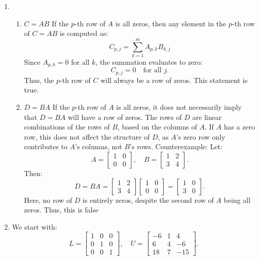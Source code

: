 \documentclass[12pt]{article}
\begin{document}
\begin{enumerate}
\item 
\begin{enumerate}
    \item \( C = AB \)
If the \( p \)-th row of \( A \) is all zeros, then any element in the \( p \)-th row of \( C = AB \) is computed as:
\[
C_{p,j} = \sum_{k=1}^m A_{p,k} B_{k,j}
\]
Since \( A_{p,k} = 0 \) for all \( k \), the summation evaluates to zero:
\[
C_{p,j} = 0 \quad \text{for all } j.
\]
Thus, the \( p \)-th row of \( C \) will always be a row of zeros. This statement is true.

\item 
\( D = BA \)
If the \( p \)-th row of \( A \) is all zeros, it does not necessarily imply that \( D = BA \) will have a row of zeros. The rows of \( D \) are linear combinations of the rows of \( B \), based on the columns of \( A \). If \( A \) has a zero row, this does not affect the structure of \( D \), as \( A \)'s zero row only contributes to \( A \)'s columns, not \( B \)'s rows.
Counterexample:
Let:
\[
A = \begin{bmatrix}
1 & 0 \\
0 & 0
\end{bmatrix}, \quad B = \begin{bmatrix}
1 & 2 \\
3 & 4
\end{bmatrix}.
\]
Then:
\[
D = BA = \begin{bmatrix}
1 & 2 \\
3 & 4
\end{bmatrix} \begin{bmatrix}
1 & 0 \\
0 & 0
\end{bmatrix} = \begin{bmatrix}
1 & 0 \\
3 & 0
\end{bmatrix}.
\]
Here, no row of \( D \) is entirely zeros, despite the second row of \( A \) being all zeros. Thus, this is false
\end{enumerate} 

\item 
We start with:
\[
L =
\begin{bmatrix}
1 & 0 & 0 \\
0 & 1 & 0 \\
0 & 0 & 1
\end{bmatrix},
\quad
U =
\begin{bmatrix}
-6 & 1 & 4 \\
6 & 4 & -6 \\
18 & 7 & -15
\end{bmatrix}.
\]


\end{enumerate}
\end{document}
